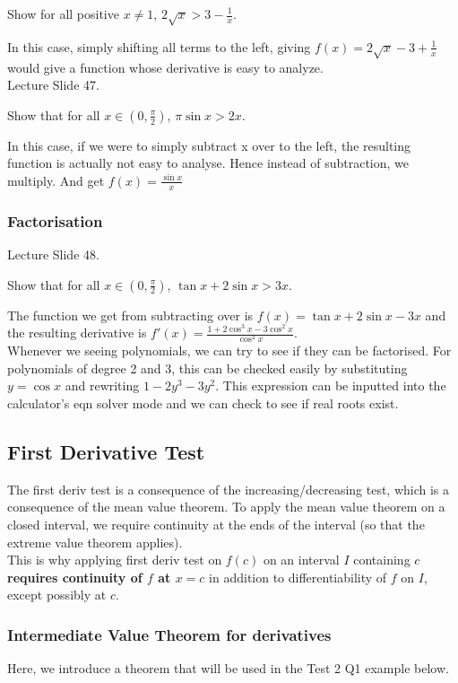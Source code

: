 \documentclass{article}
\begin{document}
Show for all positive $x\neq 1$, $2\sqrt{x}>3-\frac{1}{x}$.

In this case, simply shifting all terms to the left, giving $f(x)=2\sqrt{x}-3+\frac{1}{x}$ would give a function whose derivative is easy to analyze.\\

Lecture Slide 47.

Show that for all $x\in(0,\frac{\pi}{2})$, $\pi \sin x>2x$.

In this case, if we were to simply subtract x over to the left, the resulting function is actually not easy to analyse. Hence instead of subtraction, we multiply. And get $f(x)=\frac{\sin x}{x}$

\subsubsection{Factorisation}
Lecture Slide 48.

Show that for all $x\in (0,\frac{\pi}{2})$, $\tan x+2\sin x>3x$.

The function we get from subtracting over is $f(x)=\tan x+2\sin x-3x$ and the resulting derivative is $f'(x)=\frac{1+2\cos^3x-3\cos^2x}{\cos^2x}$.\\
Whenever we seeing polynomials, we can try to see if they can be factorised. For polynomials of degree 2 and 3, this can be checked easily by substituting $y=\cos x$ and rewriting $1-2y^3-3y^2$. This expression can be inputted into the calculator's eqn solver mode and we can check to see if real roots exist.

\subsection{First Derivative Test}
The first deriv test is a consequence of the increasing/decreasing test, which is a consequence of the mean value theorem.
To apply the mean value theorem on a closed interval, we require continuity at the ends of the interval (so that the extreme value theorem applies).\\
This is why applying first deriv test on $f(c)$ on an interval $I$ containing $c$ \textbf{requires continuity of $f$ at $x=c$} in addition to differentiability of $f$ on $I$, except possibly at $c$.

\subsubsection{Intermediate Value Theorem for derivatives}
Here, we introduce a theorem that will be used in the Test 2 Q1 example below.\\
\end{document}
